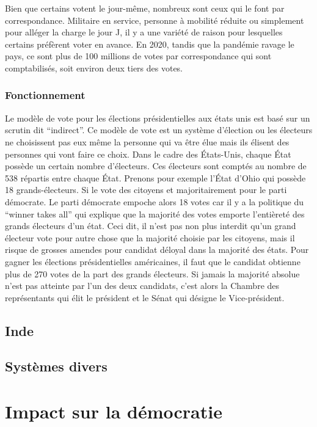 \documentclass[12pt,a4paper]{report}
\begin{document}
Bien que certains votent le jour-même, nombreux sont ceux qui le font par correspondance.
Militaire en service, personne à mobilité réduite ou simplement pour alléger la charge le jour J, il y a une variété de raison pour lesquelles certains préfèrent voter en avance.
En 2020, tandis que la pandémie ravage le pays, ce sont plus de 100 millions de votes par correspondance qui sont comptabilisés, soit environ deux tiers des votes. \nocite{electproj:electproj}

\subsection{Fonctionnement} %
Le modèle de vote pour les élections présidentielles aux états unis est basé sur un scrutin dit “indirect”.
Ce modèle de vote est un système d'élection ou les électeurs ne choisissent pas eux même la personne qui va être élue mais ils élisent des personnes qui vont faire ce choix.
Dans le cadre des États-Unis, chaque État possède un certain nombre d'électeurs.
Ces électeurs sont comptés au nombre de 538 répartis entre chaque État.
Prenons pour exemple l'État d'Ohio qui possède 18 grands-électeurs.
Si le vote des citoyens et majoritairement pour le parti démocrate.
Le parti démocrate empoche alors 18 votes car il y a la politique du “winner takes all” qui explique que la majorité des votes emporte l'entièreté des grands électeurs d’un état.
Ceci dit, il n’est pas non plus interdit qu’un grand électeur vote pour autre chose que la majorité choisie par les citoyens, mais il risque de grosses amendes pour candidat déloyal dans la majorité des états.
Pour gagner les élections présidentielles américaines, il faut que le candidat obtienne plus de 270 votes de la part des grands électeurs.
Si jamais la majorité absolue n’est pas atteinte par l’un des deux candidats, c’est alors la Chambre des représentants qui élit le président et le Sénat qui désigne le Vice-président.
\nocite{wiki:electday}
\nocite{wiki:elecus}
\nocite{wiki:eleccoll}

\section{Inde} %

\section{Systèmes divers} %


\chapter{Impact sur la démocratie}
\end{document}
